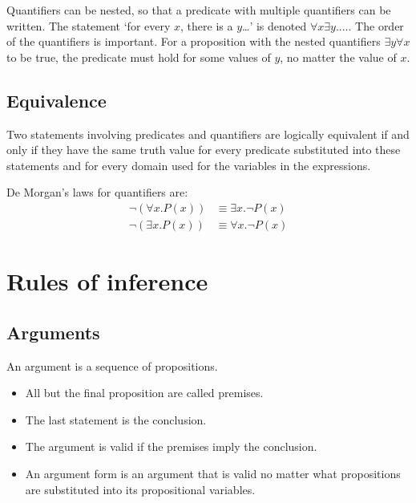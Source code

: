 Quantifiers can be nested, so that a predicate with multiple quantifiers can be written. The statement `for every \(x\), there is a \(y\)\dots' is denoted \(\forall x \exists y. \dots\). The order of the quantifiers is important. For a proposition with the nested quantifiers \(\exists y \forall x\) to be true, the predicate must hold for some values of \(y\), no matter the value of \(x\).

\subsection{Equivalence}
Two statements involving predicates and quantifiers are logically equivalent if and only if they have the same truth value for every predicate substituted into these statements and for every domain used for the variables in the expressions.

De Morgan's laws for quantifiers are:
\begin{align*}
    \neg(\forall x. P(x)) & \equiv \exists x. \neg P(x) \\
    \neg(\exists x. P(x)) & \equiv \forall x. \neg P(x)
\end{align*}

\section{Rules of inference}
\subsection{Arguments}
An argument is a sequence of propositions.
\begin{itemize}
    \item All but the final proposition are called premises.
    \item The last statement is the conclusion.
    \item The argument is valid if the premises imply the conclusion.
    \item An argument form is an argument that is valid no matter what propositions are substituted into its propositional variables.
\end{itemize}

